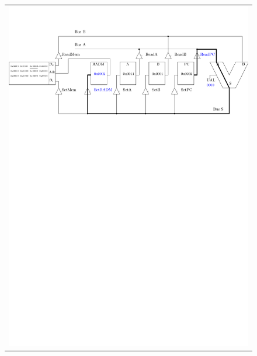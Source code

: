 \begin{figure}[htbp]
\begin{tabular}{c}
\includegraphics[width=\linewidth]{Figs/premier_chemin_sta1.pdf}\\

\end{tabular}
\end{figure}
